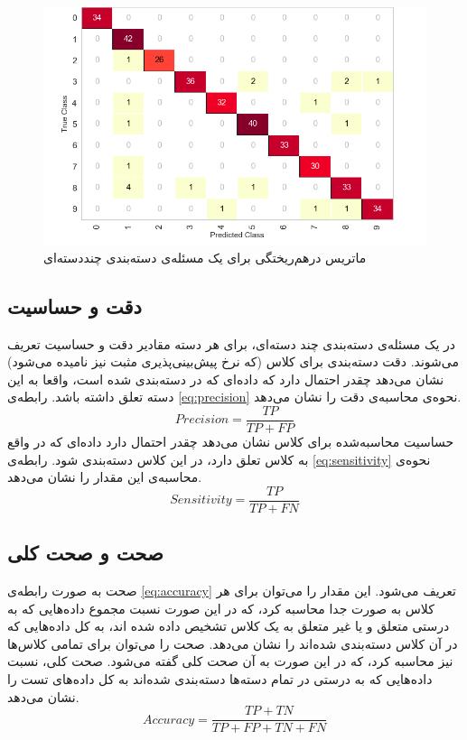 \begin{figure}[!htb]
\centering
\includegraphics[width=14cm]{Figures/confusionmatrix.png}
\caption{ ماتریس درهم‌ریختگی برای یک مسئله‌ی دسته‌بندی چنددسته‌ای \cite{Confusion}}
\label{fig:confusionmatrix}
\end{figure} 

\subsection{دقت و حساسیت}
در یک مسئله‌ی دسته‌بندی چند دسته‌ای، برای هر دسته مقادیر دقت و حساسیت تعریف می‌شوند. دقت دسته‌بندی برای کلاس  (که نرخ پیش‌بینی‌پذیری مثبت نیز نامیده می‌شود) نشان می‌دهد چقدر احتمال دارد که داده‌ای که در  دسته‌بندی شده است، واقعا به این دسته تعلق داشته باشد. رابطه‌ی \ref{eq:precision} نحوه‌ی محاسبه‌ی دقت را نشان می‌دهد.
\begin{equation}
	 Precision = \frac{TP}{TP+FP}
\label{eq:precision}
\end{equation}
حساسیت محاسبه‌شده برای کلاس  نشان می‌دهد چقدر احتمال دارد داده‌ای که در واقع به کلاس   تعلق دارد، در این کلاس دسته‌بندی شود. رابطه‌ی \ref{eq:sensitivity} نحوه‌ی محاسبه‌ی این مقدار را نشان می‌دهد.
\begin{equation}
	 Sensitivity = \frac{TP}{TP+FN}
\label{eq:sensitivity}
\end{equation}

\subsection{صحت و صحت کلی}
صحت به صورت رابطه‌ی \ref{eq:accuracy} تعریف می‌شود. این مقدار را می‌توان برای هر کلاس به صورت جدا محاسبه کرد، که در این صورت نسبت مجموع داده‌هایی که به درستی متعلق و یا غیر متعلق به یک کلاس تشخیص داده شده اند، به کل داده‌هایی که در آن کلاس دسته‌بندی شده‌اند را نشان می‌دهد. صحت را می‌توان برای تمامی کلاس‌ها نیز محاسبه کرد، که در این صورت  به آن صحت کلی گفته می‌شود. صحت کلی، نسبت داده‌هایی که به درستی در تمام دسته‌ها دسته‌بندی شده‌اند به کل داده‌های تست را نشان می‌دهد.
\begin{equation}
	 Accuracy = \frac{TP+TN}{TP+FP+TN+FN}
\label{eq:accuracy}
\end{equation}